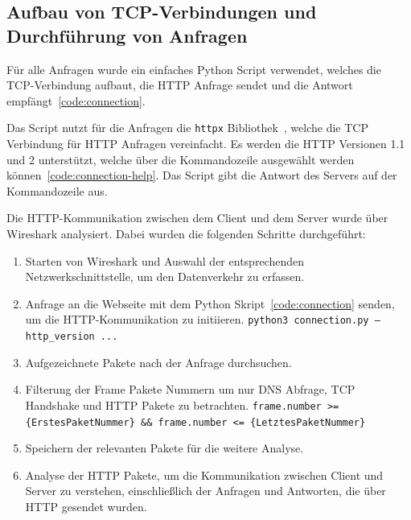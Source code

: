 \FloatBarrier
\subsection{Aufbau von TCP-Verbindungen und Durchführung von Anfragen}

Für alle Anfragen wurde ein einfaches Python Script verwendet, welches die TCP-Verbindung aufbaut, die HTTP Anfrage sendet und die Antwort empfängt~\ref{code:connection}.


Das Script nutzt für die Anfragen die \texttt{httpx} Bibliothek~\cite{httpx_http2}, welche die TCP Verbindung für HTTP Anfragen vereinfacht.
Es werden die HTTP Versionen 1.1 und 2 unterstützt, welche über die Kommandozeile ausgewählt werden können~\ref{code:connection-help}.
Das Script gibt die Antwort des Servers auf der Kommandozeile aus.


\FloatBarrier

Die HTTP-Kommunikation zwischen dem Client und dem Server wurde über Wireshark analysiert.
Dabei wurden die folgenden Schritte durchgeführt:

\begin{enumerate}\label{enum:wireshark_capture_method}
    \item Starten von Wireshark und Auswahl der entsprechenden Netzwerkschnittstelle, um den Datenverkehr zu erfassen.
    \item Anfrage an die Webseite mit dem Python Skript~\ref{code:connection} senden, um die HTTP-Kommunikation zu initiieren.
    \subitem \texttt{python3 connection.py --http\_version ...}
    \item Aufgezeichnete Pakete nach der Anfrage durchsuchen.
    \item Filterung der Frame Pakete Nummern um nur DNS Abfrage, TCP Handshake und HTTP Pakete zu betrachten.
    \subitem \texttt{frame.number >= \{ErstesPaketNummer\} \&\& frame.number <= \{LetztesPaketNummer\}}
    \item Speichern der relevanten Pakete für die weitere Analyse.
    \item Analyse der HTTP Pakete, um die Kommunikation zwischen Client und Server zu verstehen, einschließlich der Anfragen und Antworten, die über HTTP gesendet wurden.
\end{enumerate}

